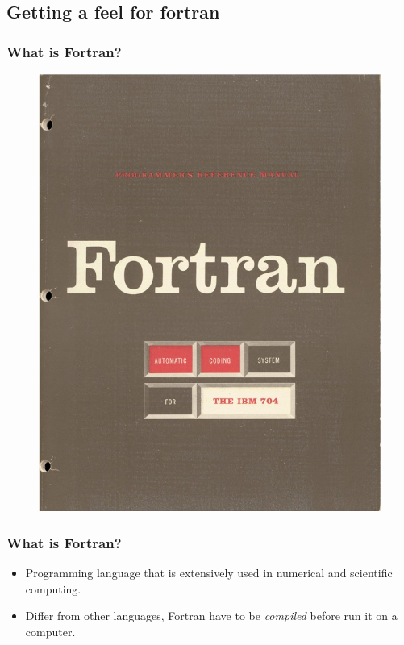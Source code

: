 \documentclass{beamer}
\begin{document}
\subsection{Getting a feel for fortran}
\begin{frame}
\frametitle{What is Fortran?}

\begin{figure}
\centering
\includegraphics[scale=0.25]{Fortran_acs_cover.jpeg}
\end{figure}

\end{frame}


\begin{frame}
\frametitle{What is Fortran?}
\begin{itemize}
\item Programming language that is extensively used in numerical and scientific computing. 
\item Differ from other languages, Fortran have to be \textit{compiled} before run it on a computer.  
\end{itemize}
\end{frame}
\end{document}
